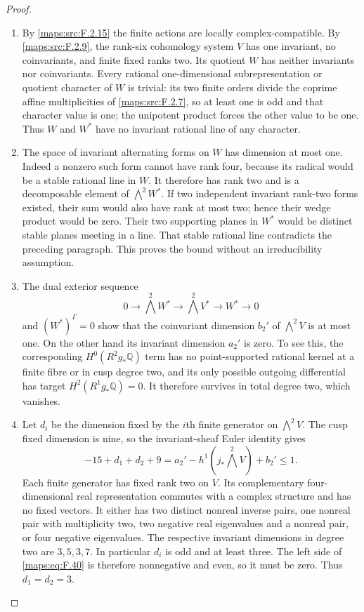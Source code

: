 \documentclass[11pt,a4paper]{article}
\theoremstyle{definition}
\begin{document}
\begin{proof}
\begin{enumerate}[label=\arabic*.]
\item By \ref{maps:src:F.2.15} the finite actions are locally complex-compatible.
By \ref{maps:src:F.2.9}, the rank-six cohomology system $V$ has one
invariant, no coinvariants, and finite fixed ranks two.
Its quotient $W$ has neither invariants nor coinvariants.
Every rational one-dimensional subrepresentation or
quotient character of $W$ is trivial: its two finite
orders divide the coprime affine multiplicities of \ref{maps:src:F.2.7},
so at least one is odd and that character value is one;
the unipotent product forces the other value to be one.
Thus $W$ and $W^*$ have no invariant rational line of any
character.

\item The space of invariant alternating forms on $W$ has
dimension at most one.  Indeed a nonzero such form cannot
have rank four, because its radical would be a stable
rational line in $W$.  It therefore has rank two and is
a decomposable element of $\bigwedge^2W^*$.
If two independent invariant rank-two forms existed,
their sum would also have rank at most two; hence their
wedge product would be zero.  Their two supporting
planes in $W^*$ would be distinct stable planes meeting
in a line.  That stable rational line contradicts the
preceding paragraph.  This proves the bound without an
irreducibility assumption.

\item The dual exterior sequence
\[
 0\longrightarrow\bigwedge^2W^*
 \longrightarrow\bigwedge^2V^*
 \longrightarrow W^*\longrightarrow0
\]
and $(W^*)^\Gamma=0$ show that the coinvariant dimension
$b_2'$ of $\bigwedge^2V$ is at most one.
On the other hand its invariant dimension $a_2'$ is zero.
To see this, the corresponding $H^0(R^2g_*\mathbb Q)$
term has no point-supported rational kernel at a finite
fibre or in cusp degree two, and its only possible outgoing
differential has target $H^2(R^1g_*\mathbb Q)=0$.
It therefore survives in total degree two, which vanishes.

\item Let $d_i$ be the dimension fixed by the $i$th finite
generator on $\bigwedge^2V$.  The cusp fixed dimension is
nine, so the invariant-sheaf Euler identity gives
\[
 -15+d_1+d_2+9
       =a_2'-h^1(j_*\bigwedge^2V)+b_2'\leq1.
 \tag{F.40}\label{maps:eq:F.40}
\]
Each finite generator has fixed rank two on $V$.
Its complementary four-dimensional real representation
commutes with a complex structure and has no fixed vectors.
It either has two distinct nonreal inverse pairs, one
nonreal pair with multiplicity two, two negative real
eigenvalues and a nonreal pair, or four negative eigenvalues.
The respective invariant dimensions in degree two are
$3,5,3,7$.  In particular $d_i$ is odd and at least three.
The left side of \eqref{maps:eq:F.40} is therefore nonnegative and even,
so it must be zero.  Thus $d_1=d_2=3$.


\end{enumerate}
\end{proof}
\end{document}
